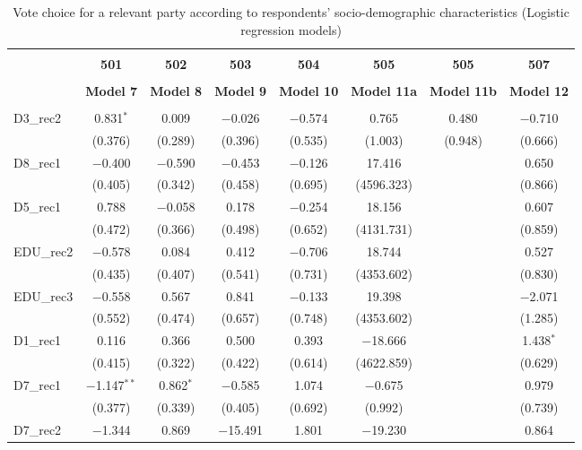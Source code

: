 \documentclass[
]{article}
\begin{document}
\begin{table}[!htbp] \centering 
  \caption{Vote choice for a relevant party according to respondents' 
                       socio-demographic characteristics (Logistic regression models)} 
  \label{table:full_logit_cy} 
\begin{tabular}{@{\extracolsep{5pt}}lccccccc} 
\\[-1.8ex]\hline \\[-1.8ex] 
 & \textbf{501} & \textbf{502} & \textbf{503} & \textbf{504} & \textbf{505} & \textbf{505} & \textbf{507} \\ 
\\[-1.8ex] & \textbf{Model 7} & \textbf{Model 8} & \textbf{Model 9} & \textbf{Model 10} & \textbf{Model 11a} & \textbf{Model 11b} & \textbf{Model 12}\\ 
\hline \\[-1.8ex] 
 D3\_rec2 & 0.831$^{*}$ & 0.009 & $-$0.026 & $-$0.574 & 0.765 & 0.480 & $-$0.710 \\ 
  & (0.376) & (0.289) & (0.396) & (0.535) & (1.003) & (0.948) & (0.666) \\ 
  D8\_rec1 & $-$0.400 & $-$0.590 & $-$0.453 & $-$0.126 & 17.416 &  & 0.650 \\ 
  & (0.405) & (0.342) & (0.458) & (0.695) & (4596.323) &  & (0.866) \\ 
  D5\_rec1 & 0.788 & $-$0.058 & 0.178 & $-$0.254 & 18.156 &  & 0.607 \\ 
  & (0.472) & (0.366) & (0.498) & (0.652) & (4131.731) &  & (0.859) \\ 
  EDU\_rec2 & $-$0.578 & 0.084 & 0.412 & $-$0.706 & 18.744 &  & 0.527 \\ 
  & (0.435) & (0.407) & (0.541) & (0.731) & (4353.602) &  & (0.830) \\ 
  EDU\_rec3 & $-$0.558 & 0.567 & 0.841 & $-$0.133 & 19.398 &  & $-$2.071 \\ 
  & (0.552) & (0.474) & (0.657) & (0.748) & (4353.602) &  & (1.285) \\ 
  D1\_rec1 & 0.116 & 0.366 & 0.500 & 0.393 & $-$18.666 &  & 1.438$^{*}$ \\ 
  & (0.415) & (0.322) & (0.422) & (0.614) & (4622.859) &  & (0.629) \\ 
  D7\_rec1 & $-$1.147$^{**}$ & 0.862$^{*}$ & $-$0.585 & 1.074 & $-$0.675 &  & 0.979 \\ 
  & (0.377) & (0.339) & (0.405) & (0.692) & (0.992) &  & (0.739) \\ 
  D7\_rec2 & $-$1.344 & 0.869 & $-$15.491 & 1.801 & $-$19.230 &  & 0.864 \\ 

\end{tabular}
\end{table}
\end{document}
